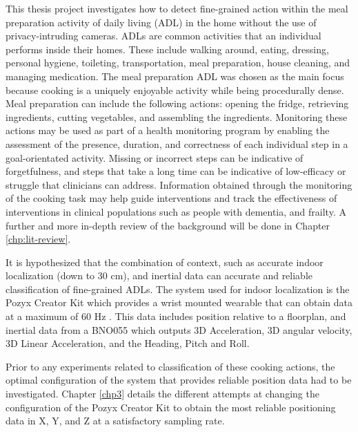 This thesis project investigates how to detect fine-grained action within the meal preparation activity of daily living 
(ADL) in the home without the use of privacy-intruding cameras. ADLs are common activities that an individual 
performs inside their homes. These include walking around, eating, dressing, personal hygiene, toileting, 
transportation, meal preparation, house cleaning, and managing medication. The meal preparation ADL was chosen as the 
main focus because cooking is a uniquely enjoyable activity while being procedurally dense. 
Meal preparation can include 
the following actions: opening the fridge, retrieving ingredients, cutting vegetables, and assembling the ingredients. 
Monitoring these actions may be used as part of a health monitoring program by enabling the assessment of the presence, 
duration, and correctness of each individual step in a goal-orientated activity. Missing or incorrect steps can be indicative of 
forgetfulness, and steps that take a long time can be indicative of low-efficacy or struggle that clinicians can address.
Information obtained through the monitoring of the cooking task may help guide interventions 
and track the effectiveness of interventions in clinical populations such as people with dementia, and frailty. 
A further and more in-depth review of the background will be done in Chapter \ref{chp:lit-review}.

It is hypothesized that the combination of context, such as accurate 
indoor localization (down to 30 cm), and inertial data can accurate and reliable 
classification of fine-grained ADLs. 
The system used for indoor localization is the Pozyx Creator Kit which provides a wrist mounted 
wearable that can obtain data at a maximum of 60 Hz \cite{pozyx_creator_nodate}. This data includes position relative to a 
floorplan, and inertial data from a BNO055 which outputs 3D Acceleration, 3D angular velocity, 
3D Linear Acceleration, and the Heading, Pitch and Roll.

Prior to any experiments related to classification of these cooking actions, the optimal 
configuration of the system that provides reliable position data had to be investigated. 
Chapter \ref{chp3} details the different attempts at changing the configuration of the Pozyx 
Creator Kit to obtain the most reliable positioning data in X, Y, and Z at a satisfactory 
sampling rate. 
